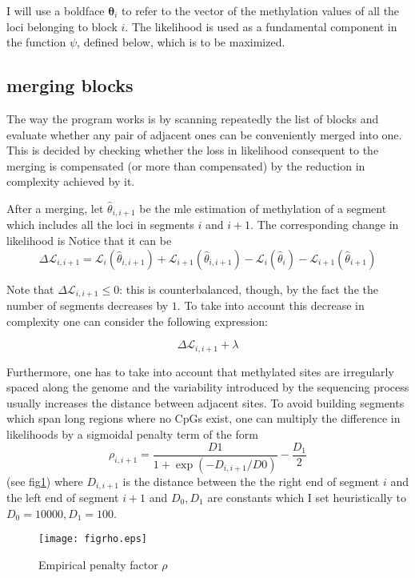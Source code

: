 \documentclass[12pt]{amsart}
\newcommand{\lik}{\ensuremath{\mathcal{L}}}
\begin{document}
I will use a boldface
$\pmb{\theta}_i$ to refer to the vector of the methylation values of all the loci belonging to 
block $i$.  The likelihood is used as a fundamental component in the function $\psi$, defined below,
which is to be maximized.

\subsection{merging blocks}

The way the program works is by 
scanning repeatedly the list of blocks and evaluate whether any pair 
of adjacent ones can be conveniently merged into one.  
This is decided by checking whether the loss in 
likelihood consequent to the merging is compensated 
(or more than compensated)
by the reduction in complexity achieved by it.

After a merging, let $\hat{\theta}_{i,i+1}$ be the mle estimation of methylation of 
a segment which includes
all the loci in segments $i$ and $i+1$.
The corresponding change in likelihood is 
Notice that it can be  
\[\Delta  \lik_{i,i+1} = \lik_i(\hat{\theta}_{i,i+1})+
	\lik_{i+1}(\hat{\theta}_{i,i+1}) 
	-\lik_i(\hat{\theta}_{i})
	-\lik_{i+1}(\hat{\theta}_{i+1}) \] 

Note that $\Delta  \lik_{i,i+1} \leq 0$: this is counterbalanced, though, by the fact the the number 
of segments decreases by $1$. To take into account this decrease in 
complexity one can consider the following expression:

\[\Delta  \lik_{i,i+1}  + \lambda\]

Furthermore, one has to take into account that methylated sites are irregularly 
spaced along the genome and the variability 
introduced by the sequencing process usually increases the distance 
between adjacent sites.
To avoid building segments which span long regions where no CpGs exist, one 
can multiply the difference in likelihoods by a sigmoidal penalty term of the
form \[\rho_{i,i+1}=\frac{D1}{1+\exp(-D_{i,i+1}/D0)}-\frac{D_1}{2}\] (see fig\ref{figrho}) 
where $D_{i,i+1}$ is the distance 
between the the right end of segment $i$ and the left end of segment $i+1$ and 
$D_0,D_1$ are constants which  I set heuristically to  $D_0=10000,D_1=100$. 

\begin{figure}\label{figrho}
\texttt{[image: figrho.eps]}
\caption{Empirical penalty factor $\rho$}
\end{figure}
\end{document}
